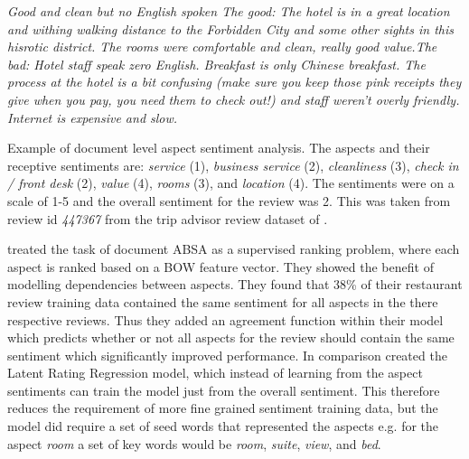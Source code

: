 \begin{example}
\textit{Good and clean but no English spoken The good: The hotel is in a great location and withing walking distance to the Forbidden City and some other sights in this hisrotic district. The rooms were comfortable and clean, really good value.The bad: Hotel staff speak zero English. Breakfast is only Chinese breakfast. The process at the hotel is a bit confusing (make sure you keep those pink receipts they give when you pay, you need them to check out!) and staff weren't overly friendly. Internet is expensive and slow.}
\caption{Example of document level aspect sentiment analysis. The aspects and their receptive sentiments are: \textit{service} (1), \textit{business service} (2), \textit{cleanliness} (3), \textit{check in / front desk} (2), \textit{value} (4), \textit{rooms} (3), and \textit{location} (4). The sentiments were on a scale of 1-5 and the overall sentiment for the review was 2. This was taken from review id \textit{447367} from the trip advisor review dataset of \citet{Wang2010LatentAR}.}
\label{example:lit_review_document_aspect_sentiment}
\end{example}

\citet{snyder-barzilay-2007-multiple} treated the task of document ABSA as a supervised ranking problem, where each aspect is ranked based on a BOW feature vector. They showed the benefit of modelling dependencies between aspects. They found that 38\% of their restaurant review training data contained the same sentiment for all aspects in the there respective reviews. Thus they added an agreement function within their model which predicts whether or not all aspects for the review should contain the same sentiment which significantly improved performance. In comparison \citet{Wang2010LatentAR} created the Latent Rating Regression model, which instead of learning from the aspect sentiments can train the model just from the overall sentiment. This therefore reduces the requirement of more fine grained sentiment training data, but the model did require a set of seed words that represented the aspects e.g. for the aspect \textit{room} a set of key words would be \textit{room}, \textit{suite}, \textit{view}, and \textit{bed}. 

